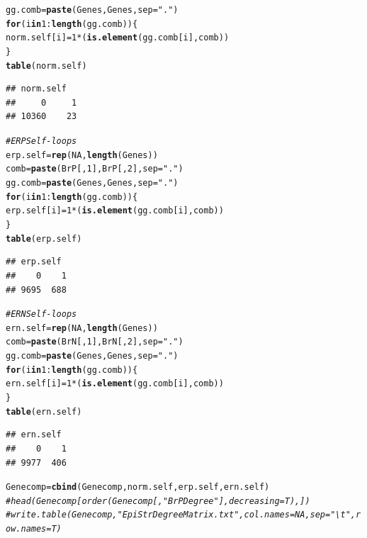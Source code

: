 \documentclass{article}\usepackage[]{graphicx}\usepackage[]{color}
\makeatletter
\newcommand{\hlnum}[1]{\textcolor[rgb]{0.686,0.059,0.569}{#1}}%
\newcommand{\hlstr}[1]{\textcolor[rgb]{0.192,0.494,0.8}{#1}}%
\newcommand{\hlcom}[1]{\textcolor[rgb]{0.678,0.584,0.686}{\textit{#1}}}%
\newcommand{\hlopt}[1]{\textcolor[rgb]{0,0,0}{#1}}%
\newcommand{\hlstd}[1]{\textcolor[rgb]{0.345,0.345,0.345}{#1}}%
\newcommand{\hlkwa}[1]{\textcolor[rgb]{0.161,0.373,0.58}{\textbf{#1}}}%
\newcommand{\hlkwb}[1]{\textcolor[rgb]{0.69,0.353,0.396}{#1}}%
\newcommand{\hlkwc}[1]{\textcolor[rgb]{0.333,0.667,0.333}{#1}}%
\newcommand{\hlkwd}[1]{\textcolor[rgb]{0.737,0.353,0.396}{\textbf{#1}}}%
\newenvironment{kframe}{%
 \def\at@end@of@kframe{}%
 \ifinner\ifhmode%
  \def\at@end@of@kframe{\end{minipage}}%
  \begin{minipage}{\columnwidth}%
 \fi\fi%
 \def\FrameCommand##1{\hskip\@totalleftmargin \hskip-\fboxsep
 \colorbox{shadecolor}{##1}\hskip-\fboxsep
     \hskip-\linewidth \hskip-\@totalleftmargin \hskip\columnwidth}%
 \MakeFramed {\advance\hsize-\width
   \@totalleftmargin\z@ \linewidth\hsize
   \@setminipage}}%
 {\par\unskip\endMakeFramed%
 \at@end@of@kframe}
\newenvironment{knitrout}{}{} %
\makeatother
\begin{document}
\begin{knitrout}
\begin{kframe}
\begin{alltt}
\hlstd{gg.comb}\hlkwb{=}\hlkwd{paste}\hlstd{(Genes,Genes,}\hlkwc{sep}\hlstd{=}\hlstr{"."}\hlstd{)}
\hlkwa{for}\hlstd{(i} \hlkwa{in} \hlnum{1}\hlopt{:}\hlkwd{length}\hlstd{(gg.comb))\{}
 \hlstd{norm.self[i]}\hlkwb{=}\hlnum{1}\hlopt{*}\hlstd{(}\hlkwd{is.element}\hlstd{(gg.comb[i],comb))}
\hlstd{\}}
\hlkwd{table}\hlstd{(norm.self)}
\end{alltt}
\begin{verbatim}
## norm.self
##     0     1 
## 10360    23
\end{verbatim}
\begin{alltt}
\hlcom{# ERP Self-loops}
\hlstd{erp.self}\hlkwb{=}\hlkwd{rep}\hlstd{(}\hlnum{NA}\hlstd{,}\hlkwd{length}\hlstd{(Genes))}
\hlstd{comb}\hlkwb{=}\hlkwd{paste}\hlstd{(BrP[,}\hlnum{1}\hlstd{],BrP[,}\hlnum{2}\hlstd{],}\hlkwc{sep}\hlstd{=}\hlstr{"."}\hlstd{)}
\hlstd{gg.comb}\hlkwb{=}\hlkwd{paste}\hlstd{(Genes,Genes,}\hlkwc{sep}\hlstd{=}\hlstr{"."}\hlstd{)}
\hlkwa{for}\hlstd{(i} \hlkwa{in} \hlnum{1}\hlopt{:}\hlkwd{length}\hlstd{(gg.comb))\{}
 \hlstd{erp.self[i]}\hlkwb{=}\hlnum{1}\hlopt{*}\hlstd{(}\hlkwd{is.element}\hlstd{(gg.comb[i],comb))}
\hlstd{\}}
\hlkwd{table}\hlstd{(erp.self)}
\end{alltt}
\begin{verbatim}
## erp.self
##    0    1 
## 9695  688
\end{verbatim}
\begin{alltt}
\hlcom{# ERN Self-loops}
\hlstd{ern.self}\hlkwb{=}\hlkwd{rep}\hlstd{(}\hlnum{NA}\hlstd{,}\hlkwd{length}\hlstd{(Genes))}
\hlstd{comb}\hlkwb{=}\hlkwd{paste}\hlstd{(BrN[,}\hlnum{1}\hlstd{],BrN[,}\hlnum{2}\hlstd{],}\hlkwc{sep}\hlstd{=}\hlstr{"."}\hlstd{)}
\hlstd{gg.comb}\hlkwb{=}\hlkwd{paste}\hlstd{(Genes,Genes,}\hlkwc{sep}\hlstd{=}\hlstr{"."}\hlstd{)}
\hlkwa{for}\hlstd{(i} \hlkwa{in} \hlnum{1}\hlopt{:}\hlkwd{length}\hlstd{(gg.comb))\{}
 \hlstd{ern.self[i]}\hlkwb{=}\hlnum{1}\hlopt{*}\hlstd{(}\hlkwd{is.element}\hlstd{(gg.comb[i],comb))}
\hlstd{\}}
\hlkwd{table}\hlstd{(ern.self)}
\end{alltt}
\begin{verbatim}
## ern.self
##    0    1 
## 9977  406
\end{verbatim}
\begin{alltt}
\hlstd{Genecomp}\hlkwb{=}\hlkwd{cbind}\hlstd{(Genecomp,norm.self,erp.self,ern.self)}
\hlcom{# head(Genecomp[order(Genecomp[,"BrPDegree"],decreasing=T),])}
\hlcom{# write.table(Genecomp,"EpiStrDegreeMatrix.txt",col.names=NA,sep="\textbackslash{}t",row.names=T)}
\end{alltt}
\end{kframe}
\end{knitrout}
\end{document}
